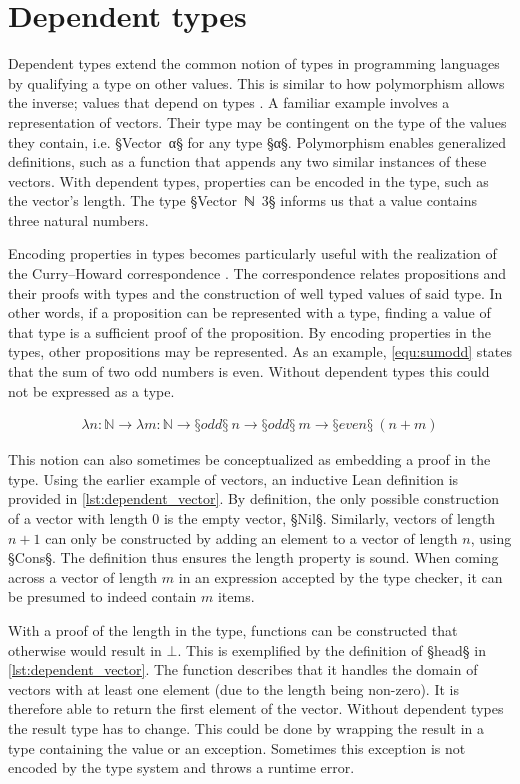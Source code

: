 \section{Dependent types}\label{sec:dependent-types}
Dependent types extend the common notion of types in programming languages by qualifying a type on other values.
This is similar to how polymorphism allows the inverse; values that depend on types \autocite{deptypes}.
A familiar example involves a representation of vectors.
Their type may be contingent on the type of the values they contain, i.e. §Vector~α§ for any type §α§.
Polymorphism enables generalized definitions, such as a function that appends any two similar instances of these vectors.
With dependent types, properties can be encoded in the type, such as the vector's length.
The type §Vector~ℕ~3§ informs us that a value contains three natural numbers.

Encoding properties in types becomes particularly useful with the realization of the Curry–Howard correspondence \autocite{martinlöf}.
The correspondence relates propositions and their proofs with types and the construction of well typed values of said type.
In other words, if a proposition can be represented with a type, finding a value of that type is a sufficient proof of the proposition.
By encoding properties in the types, other propositions may be represented.
As an example, \cref{equ:sumodd} states that the sum of two odd numbers is even.
Without dependent types this could not be expressed as a type.

\vspace{-0.9cm}
\begin{align}
    λn : ℕ → λm : ℕ → §odd§\ n → §odd§\ m → §even§\ (n + m) \label{equ:sumodd}
\end{align}

\vspace{-0.35cm}
This notion can also sometimes be conceptualized as embedding a proof in the type.
Using the earlier example of vectors, an inductive Lean definition is provided in \cref{lst:dependent_vector}.
By definition, the only possible construction of a vector with length $0$ is the empty vector, §Nil§.
Similarly, vectors of length $n+1$ can only be constructed by adding an element to a vector of length $n$, using §Cons§.
The definition thus ensures the length property is sound.
When coming across a vector of length $m$ in an expression accepted by the type checker, it can be presumed to indeed contain $m$ items.

With a proof of the length in the type, functions can be constructed that otherwise would result in $⊥$.
This is exemplified by the definition of §head§ in \cref{lst:dependent_vector}.
The function describes that it handles the domain of vectors with at least one element (due to the length being non-zero).
It is therefore able to return the first element of the vector.
Without dependent types the result type has to change.
This could be done by wrapping the result in a type containing the value or an exception.
Sometimes this exception is not encoded by the type system and throws a runtime error.

